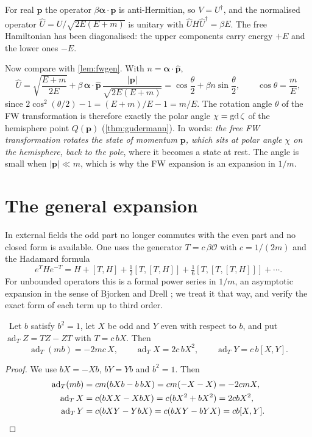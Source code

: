 For real $\mathbf p$ the operator $\beta\bm\alpha\cdot\mathbf p$ is anti-Hermitian, so $V=U^\dagger$, and the normalised operator $\hat U=U/\sqrt{2E(E+m)}$ is unitary with $\hat UH\hat U^\dagger=\beta E$. The free Hamiltonian has been diagonalised: the upper components carry energy $+E$ and the lower ones $-E$.

Now compare with \cref{lem:fwgen}. With $n=\bm\alpha\cdot\hat{\mathbf p}$,
\[
\hat U=\sqrt{\frac{E+m}{2E}}+\beta\,\bm\alpha\cdot\hat{\mathbf p}\,\frac{|\mathbf p|}{\sqrt{2E(E+m)}}=\cos\frac\theta2+\beta n\sin\frac\theta2,\qquad \cos\theta=\frac mE ,
\]
since $2\cos^2(\theta/2)-1=(E+m)/E-1=m/E$. The rotation angle $\theta$ of the FW transformation is therefore exactly the polar angle $\chi=\operatorname{gd}\zeta$ of the hemisphere point $Q(\mathbf p)$ (\cref{thm:gudermann}). In words: \emph{the free FW transformation rotates the state of momentum $\mathbf p$, which sits at polar angle $\chi$ on the hemisphere, back to the pole}, where it becomes a state at rest. The angle is small when $|\mathbf p|\ll m$, which is why the FW expansion is an expansion in $1/m$.

\section{The general expansion}

In external fields the odd part no longer commutes with the even part and no closed form is available. One uses the generator $T=c\,\beta\mathcal O$ with $c=1/(2m)$ and the Hadamard formula
\[
e^{T}He^{-T}=H+[T,H]+\tfrac12[T,[T,H]]+\tfrac16[T,[T,[T,H]]]+\cdots .
\]
For unbounded operators this is a formal power series in $1/m$, an asymptotic expansion in the sense of Bjorken and Drell \cite{BjorkenDrell}; we treat it that way, and verify the exact form of each term up to third order.

\begin{lemma}\label{lem:fwad}\ver\
Let $b$ satisfy $b^2=1$, let $X$ be odd and $Y$ even with respect to $b$, and put $\operatorname{ad}_T Z=TZ-ZT$ with $T=c\,bX$. Then
\[
\operatorname{ad}_T(mb)=-2mc\,X,\qquad \operatorname{ad}_TX=2c\,bX^2,\qquad \operatorname{ad}_TY=c\,b[X,Y].
\]
\end{lemma}
\begin{proof}
We use $bX=-Xb$, $bY=Yb$ and $b^2=1$. Then
\begin{align*}
\operatorname{ad}_T(mb)&=cm(bXb-b\,bX)=cm(-X-X)=-2cmX,\\
\operatorname{ad}_TX&=c(bXX-XbX)=c(bX^2+bX^2)=2cbX^2,\\
\operatorname{ad}_TY&=c(bXY-YbX)=c(bXY-bYX)=cb[X,Y].\qedhere
\end{align*}
\end{proof}


